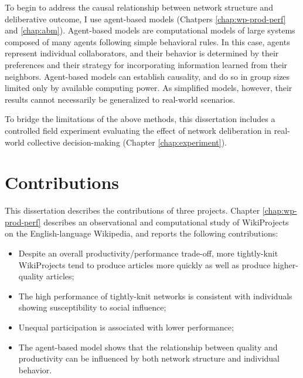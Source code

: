 To begin to address the causal relationship between network structure and
deliberative outcome, I use agent-based models
(Chatpers \ref{chap:wp-prod-perf} and \ref{chap:abm}).
Agent-based models are computational models of large systems composed of
many agents following simple behavioral rules.
In this case, agents represent individual collaborators,
and their behavior is determined by their preferences and their strategy for
incorporating information learned from their neighbors.
Agent-based models can establish causality,
and do so in group sizes limited only by available computing power.
As simplified models, however, their results cannot necessarily be generalized
to real-world scenarios.

To bridge the limitations of the above methods,
this dissertation includes a controlled field experiment evaluating the
effect of network deliberation in real-world collective decision-making
(Chapter \ref{chap:experiment}).

\section{Contributions}
This dissertation describes the contributions of three projects.
Chapter \ref{chap:wp-prod-perf} describes an observational and computational
study of WikiProjects on the English-language Wikipedia,
and reports the following contributions:
\begin{itemize}
\setlength\itemsep{0pt}
\item Despite an overall productivity/performance trade-off,
more tightly-knit WikiProjects tend to produce articles more quickly as well as produce higher-quality articles;
\item The high performance of tightly-knit networks is consistent with individuals showing susceptibility to social influence;
\item Unequal participation is associated with lower performance;
\item The agent-based model shows that the relationship between quality and productivity can be influenced by both network structure and individual behavior.
\end{itemize}

